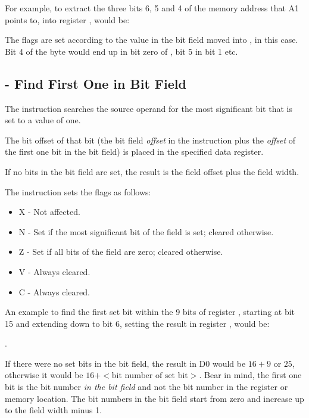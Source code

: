 For example, to extract the three bits 6, 5 and 4 of the memory address that A1 points to, into register , would be:


The flags are set according to the value in the bit field moved into , in this case. Bit 4 of the byte would end up in bit zero of , bit 5 in bit 1 etc.

\subsection{ - Find First One in Bit Field}

The  instruction searches the source operand for the most significant bit that is set to a value of one. 

The bit offset of that bit (the bit field \emph{offset} in the instruction plus the \emph{offset} of the first one bit in the bit field) is placed in the specified data register. 

If no bits in the bit field are set, the result is the field offset plus the field width.

The instruction sets the flags as follows:

\begin{itemize}
    \item X - Not affected.
    \item N - Set if the most significant bit of the field is set; cleared otherwise.
    \item Z - Set if all bits of the field are zero; cleared otherwise.
    \item V - Always cleared.
    \item C - Always cleared.
\end{itemize}

An example to find the first set bit within the 9 bits of register , starting at bit 15 and extending down to bit 6, setting the result in register , would be:

.

If there were no set bits in the bit field, the result in D0 would be $16 + 9$ or $25$, otherwise it would be $16 + <\text{bit number of set bit}>$. Bear in mind, the first one bit is the bit number \emph{in the bit field} and not the bit number in the register or memory location. The bit numbers in the bit field start from zero and increase up to the field width minus 1.

